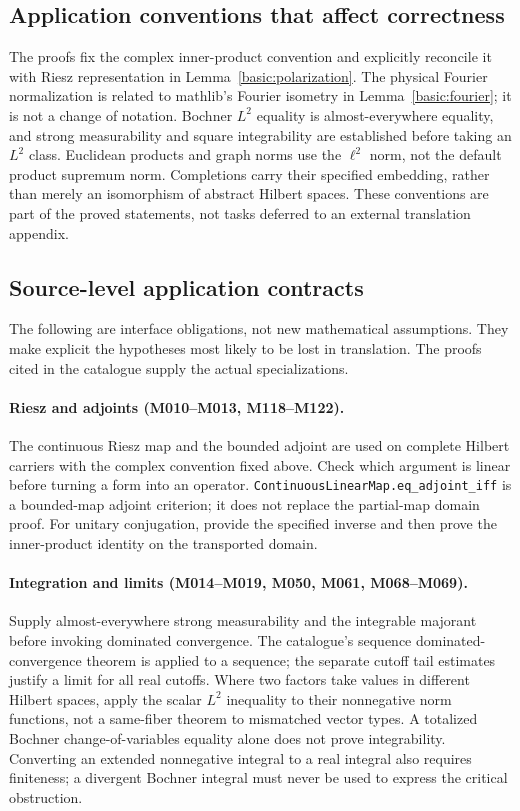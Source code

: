 \documentclass[11pt,a4paper]{article}
\theoremstyle{definition}
\theoremstyle{remark}
\begin{document}
\subsection{Application conventions that affect correctness}
The proofs fix the complex inner-product convention and explicitly
reconcile it with Riesz representation in Lemma~\ref{basic:polarization}.
The physical Fourier normalization is related to mathlib's Fourier
isometry in Lemma~\ref{basic:fourier}; it is not a change of notation.
Bochner $L^2$ equality is almost-everywhere equality, and strong
measurability and square integrability are established before taking an
$L^2$ class. Euclidean products and graph norms use the $\ell^2$ norm,
not the default product supremum norm. Completions carry their specified
embedding, rather than merely an isomorphism of abstract Hilbert spaces.
These conventions are part of the proved statements, not tasks deferred
to an external translation appendix.


\subsection{Source-level application contracts}
\label{sec:api-contracts}
The following are interface obligations, not new mathematical
assumptions. They make explicit the hypotheses most likely to be lost
in translation. The proofs cited in the catalogue supply the actual
specializations.

\paragraph{Riesz and adjoints (M010--M013, M118--M122).}
The continuous Riesz map and the bounded adjoint are used on complete
Hilbert carriers with the complex convention fixed above. Check which
argument is linear before turning a form into an operator.
\nolinkurl{ContinuousLinearMap.eq_adjoint_iff} is a bounded-map
adjoint criterion; it does not replace the partial-map domain proof.
For unitary conjugation, provide the specified inverse and then prove
the inner-product identity on the transported domain.

\paragraph{Integration and limits (M014--M019, M050, M061, M068--M069).}
Supply almost-everywhere strong measurability and the integrable
majorant before invoking dominated convergence. The catalogue's
sequence dominated-convergence theorem is applied to a sequence;
the separate cutoff tail estimates justify a limit for all real
cutoffs. Where two factors take values in different Hilbert spaces,
apply the scalar $L^2$ inequality to their nonnegative norm functions,
not a same-fiber theorem to mismatched vector types. A totalized
Bochner change-of-variables equality alone does not prove
integrability. Converting an extended nonnegative integral to a real
integral also requires finiteness; a divergent Bochner integral must
never be used to express the critical obstruction.
\end{document}

